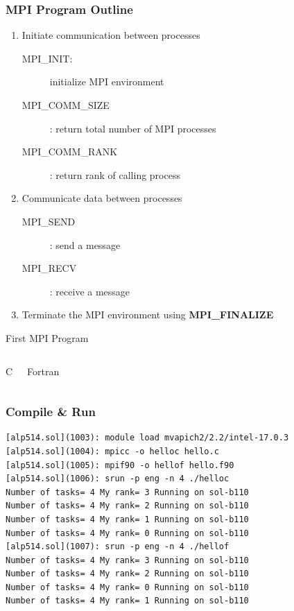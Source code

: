 \documentclass[10pt,t]{beamer}
\begin{document}
\begin{frame}
  \frametitle{MPI Program Outline}
  \begin{enumerate}
    \item Initiate communication between processes
      \begin{description}
        \item[MPI\_INIT:] initialize MPI environment
        \item[MPI\_COMM\_SIZE]: return total number of MPI processes
        \item[MPI\_COMM\_RANK]: return rank of calling process
      \end{description}
      \item Communicate data between processes
        \begin{description}
          \item[MPI\_SEND]: send a message
          \item[MPI\_RECV]: receive a message 
        \end{description}
      \item Terminate the MPI environment using \textbf{\textcolor{lubrown}{MPI\_FINALIZE}}
  \end{enumerate}
\end{frame}

\begin{frame}{First MPI Program}
  \begin{columns}
    \begin{exampleblock}{C}
      
    \end{exampleblock}
    \begin{exampleblock}{Fortran}
      
    \end{exampleblock}
  \end{columns}
\end{frame}

\begin{frame}[fragile]
  \frametitle{Compile \& Run}
  \begin{exampleblock}{}
    \begin{lstlisting}
[alp514.sol](1003): module load mvapich2/2.2/intel-17.0.3
[alp514.sol](1004): mpicc -o helloc hello.c
[alp514.sol](1005): mpif90 -o hellof hello.f90
[alp514.sol](1006): srun -p eng -n 4 ./helloc
Number of tasks= 4 My rank= 3 Running on sol-b110
Number of tasks= 4 My rank= 2 Running on sol-b110
Number of tasks= 4 My rank= 1 Running on sol-b110
Number of tasks= 4 My rank= 0 Running on sol-b110
[alp514.sol](1007): srun -p eng -n 4 ./hellof
Number of tasks= 4 My rank= 3 Running on sol-b110
Number of tasks= 4 My rank= 2 Running on sol-b110
Number of tasks= 4 My rank= 0 Running on sol-b110
Number of tasks= 4 My rank= 1 Running on sol-b110
    \end{lstlisting}
  \end{exampleblock}
\end{frame}
\end{document}
